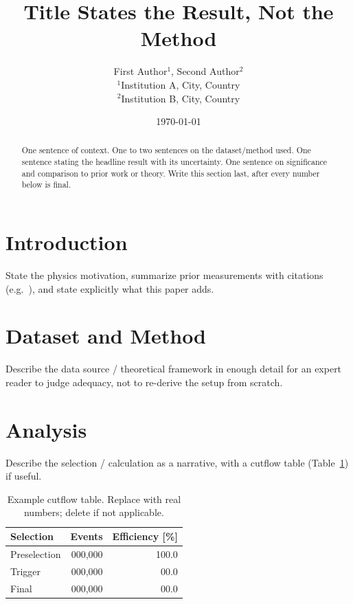 \documentclass[11pt]{article}
\title{Title States the Result, Not the Method}
\author{First Author$^{1}$, Second Author$^{2}$ \\[4pt]
  \small $^1$Institution A, City, Country \\
  \small $^2$Institution B, City, Country}
\date{\today}
\begin{document}
\maketitle

\begin{abstract}
  One sentence of context. One to two sentences on the dataset/method used.
  One sentence stating the headline result with its uncertainty. One
  sentence on significance and comparison to prior work or theory. Write
  this section last, after every number below is final.
\end{abstract}

\section{Introduction}
\label{sec:intro}

State the physics motivation, summarize prior measurements with citations
(e.g.~\cite{example:key}), and state explicitly what this paper adds.

\section{Dataset and Method}
\label{sec:dataset}

Describe the data source / theoretical framework in enough detail for an
expert reader to judge adequacy, not to re-derive the setup from scratch.

\section{Analysis}
\label{sec:analysis}

Describe the selection / calculation as a narrative, with a cutflow table
(Table~\ref{tab:cutflow}) if useful.

\begin{table}[htbp]
  \centering
  \caption{Example cutflow table. Replace with real numbers; delete if not
    applicable.}
  \label{tab:cutflow}
  \begin{tabular}{lrr}
    \toprule
    Selection & Events & Efficiency [\%] \\
    \midrule
    Preselection & 000{,}000 & 100.0 \\
    Trigger      & 000{,}000 &  00.0 \\
    Final        & 000{,}000 &  00.0 \\
    \bottomrule
  \end{tabular}
\end{table}
\end{document}
